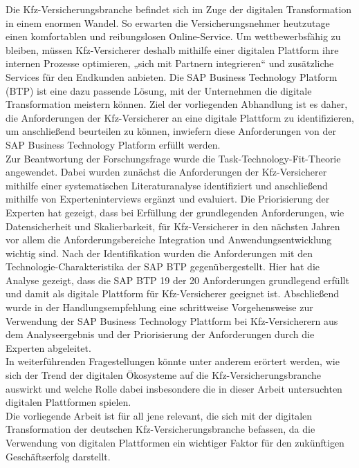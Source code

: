 Die Kfz-Versicherungsbranche befindet sich im Zuge der digitalen Transformation in einem enormen Wandel. So erwarten die Versicherungsnehmer heutzutage einen komfortablen und reibungslosen Online-Service. Um wettbewerbsfähig zu bleiben, müssen Kfz-Versicherer deshalb mithilfe einer digitalen Plattform ihre internen Prozesse optimieren, „sich mit Partnern integrieren“ und zusätzliche Services für den Endkunden anbieten. Die SAP Business Technology Platform (BTP) ist eine dazu passende Lösung, mit der Unternehmen die digitale Transformation meistern können. Ziel der vorliegenden Abhandlung ist es daher, die Anforderungen der Kfz-Versicherer an eine digitale Plattform zu identifizieren, um anschließend beurteilen zu können, inwiefern diese Anforderungen von der SAP Business Technology Platform erfüllt werden.\\
Zur Beantwortung der Forschungsfrage wurde die Task-Technology-Fit-Theorie angewendet. Dabei wurden zunächst die Anforderungen der Kfz-Versicherer mithilfe einer systematischen Literaturanalyse identifiziert und anschließend mithilfe von Experteninterviews ergänzt und evaluiert. Die Priorisierung der Experten hat gezeigt, dass bei Erfüllung der grundlegenden Anforderungen, wie Datensicherheit und Skalierbarkeit, für Kfz-Versicherer in den nächsten Jahren vor allem die Anforderungsbereiche Integration und Anwendungsentwicklung wichtig sind. Nach der Identifikation wurden die Anforderungen mit den Technologie-Charakteristika der SAP BTP gegenübergestellt. Hier hat die Analyse gezeigt, dass die SAP BTP 19 der 20 Anforderungen grundlegend erfüllt und damit als digitale Plattform für Kfz-Versicherer geeignet ist. Abschließend wurde in der Handlungsempfehlung eine schrittweise Vorgehensweise zur Verwendung der SAP Business Technology Plattform bei Kfz-Versicherern aus dem Analyseergebnis und der Priorisierung der Anforderungen durch die Experten abgeleitet.\\
In weiterführenden Fragestellungen könnte unter anderem erörtert werden, wie sich der Trend der digitalen Ökosysteme auf die Kfz-Versicherungsbranche auswirkt und welche Rolle dabei insbesondere die in dieser Arbeit untersuchten digitalen Plattformen spielen.\\
Die vorliegende Arbeit ist für all jene relevant, die sich mit der digitalen Transformation der deutschen Kfz-Versicherungsbranche befassen, da die Verwendung von digitalen Plattformen ein wichtiger Faktor für den zukünftigen Geschäftserfolg darstellt.







